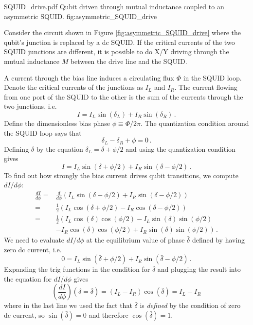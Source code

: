 
\quickfig{\columnwidth}
{SQUID_drive.pdf}
{Qubit driven through mutual inductance coupled to an asymmetric SQUID.}
{fig:asymmetric_SQUID_drive}

Consider the circuit shown in Figure \ref{fig:asymmetric_SQUID_drive} where the qubit's junction is replaced by a dc SQUID.
If the critical currents of the two SQUID junctions are different, it is possible to do X/Y driving through the mutual inductance $M$ between the drive line and the SQUID.

A current through the bias line induces a circulating flux $\Phi$ in the SQUID loop.
Denote the critical currents of the junctions as $I_L$ and $I_R$.
The current flowing from one port of the SQUID to the other is the sum of the currents through the two junctions, i.e.
\begin{equation}
  I = I_L \sin(\delta_L) + I_R \sin(\delta_R) \, .
\end{equation}
Define the dimensionless bias phase $\phi \equiv \Phi / 2\pi$.
The quantization condition around the SQUID loop says that
\begin{equation}
  \delta_L - \delta_R + \phi = 0 \, .
\end{equation}
Defining $\delta$ by the equation $\delta_L = \delta + \phi/2$ and using the quantization condition gives
\begin{equation}
  I = I_L \sin(\delta + \phi/2) + I_R \sin(\delta - \phi/2) \, .
\end{equation}
To find out how strongly the bias current drives qubit transitions, we compute $dI/d\phi$:
\begin{align*}
  \frac{dI}{d\phi}
  =& \frac{d}{d\phi} \left( I_L \sin(\delta + \phi/2) + I_R \sin(\delta - \phi/2) \right) \\
  =& \frac{1}{2} \left( I_L \cos(\delta + \phi/2) - I_R \cos(\delta - \phi/2) \right) \\
  =& \frac{1}{2}
  \left(
              I_L \cos(\delta) \cos(\phi/2) - I_L \sin(\delta)\sin(\phi/2) \right. \\
    & \left. -I_R \cos(\delta) \cos(\phi/2) + I_R \sin(\delta)\sin(\phi/2)
  \right) \, .
\end{align*}
We need to evaluate $dI/d\phi$ at the equilibrium value of phase $\bar{\delta}$ defined by having zero dc current, i.e.
\begin{equation*}
  0 = I_L \sin(\bar{\delta} + \phi/2) + I_R \sin(\bar{\delta} - \phi/2) \, .
\end{equation*}
Expanding the trig functions in the condition for $\bar{\delta}$ and plugging the result into the equation for $dI/d\phi$ gives
\begin{equation}
  \left( \frac{dI}{d\phi} \right)(\delta=\bar{\delta})
  = (I_L - I_R) \cos(\bar{\delta})
  = I_L - I_R
\end{equation}
where in the last line we used the fact that $\bar{\delta}$ is \emph{defined} by the condition of zero dc current, so $\sin(\bar{\delta}) = 0$ and therefore $\cos(\bar{\delta})=1$.

